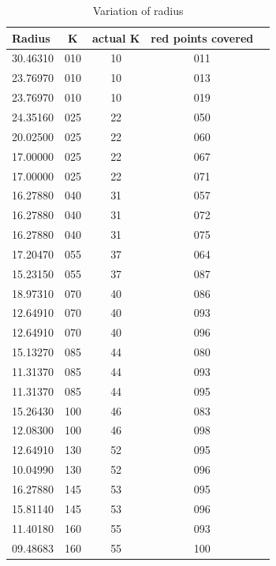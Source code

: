 \documentclass[12pt,a4wide]{report}
\theoremstyle{plain}
\theoremstyle{definition}
\theoremstyle{remark}
\begin{document}
\begin{table}[H]
  \centering
  \caption{Variation of radius}
  \begin{tabular}{||l|c|c|c|c||} \hline
   Radius & K & actual K & red points covered \\ \hline
   30.46310 & 010 & 10 & 011 \\ \hline
   23.76970 & 010 & 10 & 013 \\ \hline
   23.76970 & 010 & 10 & 019 \\ \hline \hline
   24.35160 & 025 & 22 & 050 \\ \hline
   20.02500 & 025 & 22 & 060 \\ \hline
   17.00000 & 025 & 22 & 067 \\ \hline
   17.00000 & 025 & 22 & 071 \\ \hline \hline 
   16.27880 & 040 & 31 & 057 \\ \hline
   16.27880 & 040 & 31 & 072 \\ \hline
   16.27880 & 040 & 31 & 075 \\ \hline \hline
   17.20470 & 055 & 37 & 064 \\ \hline
   15.23150 & 055 & 37 & 087 \\ \hline \hline 
   18.97310 & 070 & 40 & 086 \\ \hline
   12.64910 & 070 & 40 & 093 \\ \hline
   12.64910 & 070 & 40 & 096 \\ \hline \hline 
   15.13270 & 085 & 44 & 080 \\ \hline 
   11.31370 & 085 & 44 & 093 \\ \hline 
   11.31370 & 085 & 44 & 095 \\ \hline \hline 
   15.26430 & 100 & 46 & 083 \\ \hline 
   12.08300 & 100 & 46 & 098 \\ \hline \hline 
   12.64910 & 130 & 52 & 095 \\ \hline 
   10.04990 & 130 & 52 & 096 \\ \hline \hline 
   16.27880 & 145 & 53 & 095 \\ \hline 
   15.81140 & 145 & 53 & 096 \\ \hline \hline 
   11.40180 & 160 & 55 & 093 \\ \hline 
   09.48683 & 160 & 55 & 100 \\ \hline \hline 
   
  \end{tabular}
\end{table}
\end{document}

